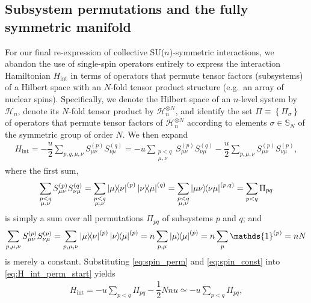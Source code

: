 \documentclass[nofootinbib,notitlepage,11pt]{revtex4-2}
\renewcommand{\t}{\text} %
\newcommand{\f}[2]{\dfrac{#1}{#2}} %
\renewcommand{\set}[1]{\left\{#1\right\}} %
\newcommand{\1}{\mathds{1}}
\renewcommand{\H}{\mathcal{H}}
\renewcommand{\SS}{\mathbb{S}}
\begin{document}
\subsection{Subsystem permutations and the fully symmetric manifold}
\label{sec:perm_ops}

For our final re-expression of collective SU($n$)-symmetric
interactions, we abandon the use of single-spin operators entirely to
express the interaction Hamiltonian $H_{\t{int}}$ in terms of
operators that permute tensor factors (subsystems) of a Hilbert space
with an $N$-fold tensor product structure (e.g.~an array of nuclear
spins).  Specifically, we denote the Hilbert space of an $n$-level
system by $\H_n$, denote its $N$-fold tensor product by
$\H_n^{\otimes N}$, and identify the set $\Pi\equiv\set{\Pi_\sigma}$
of operators that permute tensor factors of $\H_n^{\otimes N}$
according to elements $\sigma\in\SS_N$ of the symmetric group of order
$N$.  We then expand
\begin{align}
  H_{\t{int}}
  = -\f{u}{2} \sum_{p,q,\mu,\nu} S_{\mu\nu}^{(p)} S_{\nu\mu}^{(q)}
  = -u\sum_{\substack{p<q\\\mu,\nu}} S_{\mu\nu}^{(p)} S_{\nu\mu}^{(q)}
  - \f{u}{2} \sum_{p,\mu,\nu} S_{\mu\nu}^{(p)} S_{\nu\mu}^{(p)},
  \label{eq:H_int_perm_start}
\end{align}
where the first sum,
\begin{align}
  \sum_{\substack{p<q\\\mu,\nu}} S_{\mu\nu}^{(p)} S_{\nu\mu}^{(q)}
  = \sum_{\substack{p<q\\\mu,\nu}} \op{\mu}{\nu}^{(p)} \op{\nu}{\mu}^{(q)}
  = \sum_{\substack{p<q\\\mu,\nu}} \op{\mu\nu}{\nu\mu}^{(p,q)}
  = \sum_{p<q} \Pi_{pq}
  \label{eq:spin_perm}
\end{align}
is simply a sum over all permutations $\Pi_{pq}$ of subsystems $p$ and
$q$; and
\begin{align}
  \sum_{p,\mu,\nu} S_{\mu\nu}^{(p)} S_{\nu\mu}^{(p)}
  = \sum_{p,\mu,\nu} \op{\mu}{\nu}^{(p)} \op{\nu}{\mu}^{(p)}
  = n \sum_{p,\mu} \op{\mu}{\mu}^{(p)}
  = n \sum_p \1^{(p)}
  = n N
  \label{eq:spin_const}
\end{align}
is merely a constant.  Substituting \eqref{eq:spin_perm} and
\eqref{eq:spin_const} into \eqref{eq:H_int_perm_start} yields
\begin{align}
  H_{\t{int}} = -u \sum_{p<q} \Pi_{pq} - \f12 N n u
  \simeq -u\sum_{p<q} \Pi_{pq},
  \label{eq:H_int_perm}
\end{align}
\end{document}
